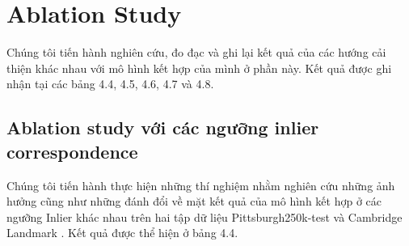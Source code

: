 \section{Ablation Study}
Chúng tôi tiến hành nghiên cứu, đo đạc và ghi lại kết quả của các hướng cải thiện khác nhau với mô hình kết hợp của mình ở phần này. Kết quả được ghi nhận tại các bảng 4.4, 4.5, 4.6, 4.7 và 4.8.

\subsection*{Ablation study với các ngưỡng inlier correspondence}
Chúng tôi tiến hành thực hiện những thí nghiệm nhằm nghiên cứu những ảnh hưởng cũng như những đánh đổi về mặt kết quả của mô hình kết hợp ở các ngưỡng Inlier khác nhau trên hai tập dữ liệu Pittsburgh250k-test \cite{6618963} và Cambridge Landmark \cite{kendall2016posenet}. Kết quả được thể hiện ở bảng 4.4.
\bgroup
\def\arraystretch{1.4}%
\setlength\tabcolsep{10 pt}
